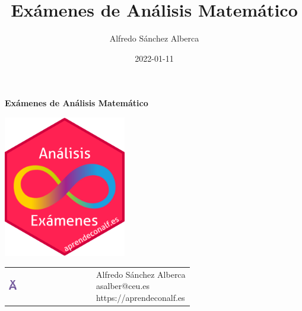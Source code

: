 \documentclass[
  a4paper,
]{scrreport}
\title{Exámenes de Análisis Matemático}
\author{Alfredo Sánchez Alberca}
\date{2022-01-11}
\renewcommand*\contentsname{Tabla de contenidos}
\newcommand\contentsname{Tabla de contenidos}
\theoremstyle{definition}
\theoremstyle{remark}
\begin{document}
\begin{titlepage}

\begin{center}
\vspace*{5cm}

\Huge
{\textbf{\textsf{Exámenes de Análisis Matemático}}}

\vspace{0.5cm}
\LARGE
{\textbf{\textsf{}}}

\vspace{1.5cm}

\includegraphics[width=0.4\textwidth]{img/logos/sticker.png}
\end{center}

\vfill

\begin{flushleft}
\begin{tabular}{ll}
\includegraphics[width=0.1\textwidth]{img/logos/aprendeconalf.png} & \parbox[b]{5cm}{\Large\textsf{Alfredo
Sánchez
Alberca}\\ \textsf{asalber@ceu.es} \\ \textsf{https://aprendeconalf.es}}
\end{tabular}
\end{flushleft}
\end{titlepage}\ifdefined\Shaded\renewenvironment{Shaded}{\begin{tcolorbox}[boxrule=0pt, enhanced, sharp corners, borderline west={3pt}{0pt}{shadecolor}, interior hidden, breakable, frame hidden]}{\end{tcolorbox}}\fi

\renewcommand*\contentsname{Tabla de contenidos}
{
\hypersetup{linkcolor=}
\setcounter{tocdepth}{2}
\tableofcontents
}
\end{document}
